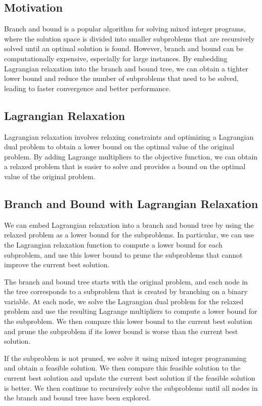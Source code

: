 \subsection{Motivation}

Branch and bound is a popular algorithm for solving mixed integer programs, where the solution space is divided into smaller subproblems that are recursively solved until an optimal solution is found. However, branch and bound can be computationally expensive, especially for large instances. By embedding Lagrangian relaxation into the branch and bound tree, we can obtain a tighter lower bound and reduce the number of subproblems that need to be solved, leading to faster convergence and better performance.

\subsection{Lagrangian Relaxation}

Lagrangian relaxation involves relaxing constraints and optimizing a Lagrangian dual problem to obtain a lower bound on the optimal value of the original problem. By adding Lagrange multipliers to the objective function, we can obtain a relaxed problem that is easier to solve and provides a bound on the optimal value of the original problem.

\subsection{Branch and Bound with Lagrangian Relaxation}

We can embed Lagrangian relaxation into a branch and bound tree by using the relaxed problem as a lower bound for the subproblems. In particular, we can use the Lagrangian relaxation function to compute a lower bound for each subproblem, and use this lower bound to prune the subproblems that cannot improve the current best solution.

The branch and bound tree starts with the original problem, and each node in the tree corresponds to a subproblem that is created by branching on a binary variable. At each node, we solve the Lagrangian dual problem for the relaxed problem and use the resulting Lagrange multipliers to compute a lower bound for the subproblem. We then compare this lower bound to the current best solution and prune the subproblem if its lower bound is worse than the current best solution.

If the subproblem is not pruned, we solve it using mixed integer programming and obtain a feasible solution. We then compare this feasible solution to the current best solution and update the current best solution if the feasible solution is better. We then continue to recursively solve the subproblems until all nodes in the branch and bound tree have been explored.

